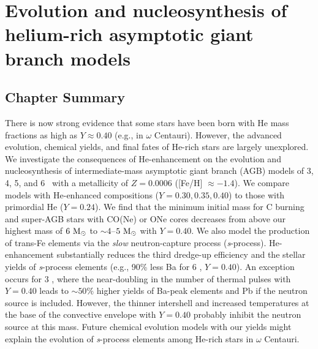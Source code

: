 \chapter[Evolution and nucleosynthesis of helium-rich AGB models]{Evolution and nucleosynthesis of helium-rich asymptotic giant branch models}\label{chap:shinglesetal2015}


\section{Chapter Summary}
There is now strong evidence that some stars have been born with He mass fractions as high as $Y\approx 0.40$ (e.g., in $\omega$ Centauri). However, the advanced evolution, chemical yields, and final fates of He-rich stars are largely unexplored. We investigate the consequences of He-enhancement on the evolution and nucleosynthesis of intermediate-mass asymptotic giant branch (AGB) models of 3, 4, 5, and 6 \Msun\ with a metallicity of $Z = 0.0006$ ([Fe/H] $\approx -1.4$). We compare models with He-enhanced compositions ($Y=0.30, 0.35, 0.40$) to those with primordial He ($Y=0.24$). We find that the minimum initial mass for C burning and super-AGB stars with CO(Ne) or ONe cores decreases from above our highest mass of $6\ \mathrm{M}_{\odot}$ to $\sim 4$--$5\ \mathrm{M}_{\odot}$ with $Y=0.40$. We also model the production of trans-Fe elements via the \textit{slow} neutron-capture process (\textit{s}-process). He-enhancement substantially reduces the third dredge-up efficiency and the stellar yields of \textit{s}-process elements (e.g., 90\% less Ba for 6 \Msun, $Y=0.40$). An exception occurs for 3 \Msun, where the near-doubling in the number of thermal pulses with $Y=0.40$ leads to $\sim50\%$ higher yields of Ba-peak elements and Pb if the  neutron source is included. However, the thinner intershell and increased temperatures at the base of the convective envelope with $Y=0.40$ probably inhibit the  neutron source at this mass. Future chemical evolution models with our yields might explain the evolution of \textit{s}-process elements among He-rich stars in $\omega$ Centauri.


